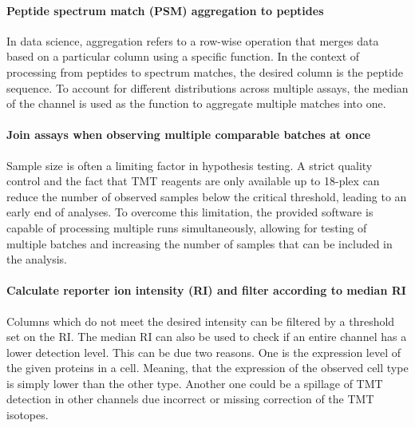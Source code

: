 \documentclass[
]{article}
\begin{document}
\hypertarget{peptide-spectrum-match-psm-aggregation-to-peptides}{%
\paragraph{Peptide spectrum match (PSM) aggregation to
peptides}\label{peptide-spectrum-match-psm-aggregation-to-peptides}}

In data science, aggregation refers to a row-wise operation that merges
data based on a particular column using a specific function. In the
context of processing from peptides to spectrum matches, the desired
column is the peptide sequence. To account for different distributions
across multiple assays, the median of the channel is used as the
function to aggregate multiple matches into one.

\hypertarget{join-assays-when-observing-multiple-comparable-batches-at-once}{%
\paragraph{Join assays when observing multiple comparable batches at
once}\label{join-assays-when-observing-multiple-comparable-batches-at-once}}

Sample size is often a limiting factor in hypothesis testing. A strict
quality control and the fact that TMT reagents are only available up to
18-plex can reduce the number of observed samples below the critical
threshold, leading to an early end of analyses. To overcome this
limitation, the provided software is capable of processing multiple runs
simultaneously, allowing for testing of multiple batches and increasing
the number of samples that can be included in the analysis.

\hypertarget{calculate-reporter-ion-intensity-ri-and-filter-according-to-median-ri}{%
\paragraph{Calculate reporter ion intensity (RI) and filter according to
median
RI}\label{calculate-reporter-ion-intensity-ri-and-filter-according-to-median-ri}}

Columns which do not meet the desired intensity can be filtered by a
threshold set on the RI. The median RI can also be used to check if an
entire channel has a lower detection level. This can be due two reasons.
One is the expression level of the given proteins in a cell. Meaning,
that the expression of the observed cell type is simply lower than the
other type. Another one could be a spillage of TMT detection in other
channels due incorrect or missing correction of the TMT isotopes.
\end{document}

